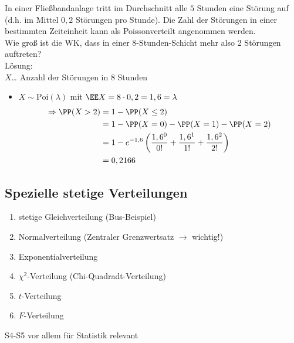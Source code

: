  In einer Fließbandanlage tritt im Durchschnitt alle $5$ Stunden eine Störung auf (d.h. im Mittel $0,2$ Störungen pro Stunde). Die Zahl der Störungen in einer bestimmten Zeiteinheit kann als Poissonverteilt angenommen werden.\\
Wie groß ist die WK, dass in einer 8-Stunden-Schicht mehr also 2 Störungen auftreten?\\
Lösung:\\
$X$… Anzahl der Störungen in 8 Stunden
\begin{itemize}
\item $X\sim \mathrm{Poi}(\lambda)$ mit $\EE X = 8 \cdot 0,2 = 1,6 = \lambda$
\begin{align*}
\Rightarrow \PP(X >2) &= 1- \PP(X\leq 2) \\
&= 1- \PP(X=0) - \PP(X=1) - \PP(X=2)\\
&= 1-e^{-1,6}\left(\frac{1,6^0}{0!}+\frac{1,6^1}{1!}+\frac{1,6^2}{2!}\right)\\
&= 0,2166
\end{align*}
\end{itemize}

\subsection{Spezielle stetige Verteilungen}

\begin{enumerate}[label=(D\arabic*)]
\item stetige Gleichverteilung (Bus-Beispiel)
\item Normalverteilung (Zentraler Grenzwertsatz $\to$ wichtig!)
\item Exponentialverteilung
\item $\chi^2$-Verteilung (Chi-Quadradt-Verteilung)
\item $t$-Verteilung
\item $F$-Verteilung
\end{enumerate}
S4-S5 vor allem für Statistik relevant

